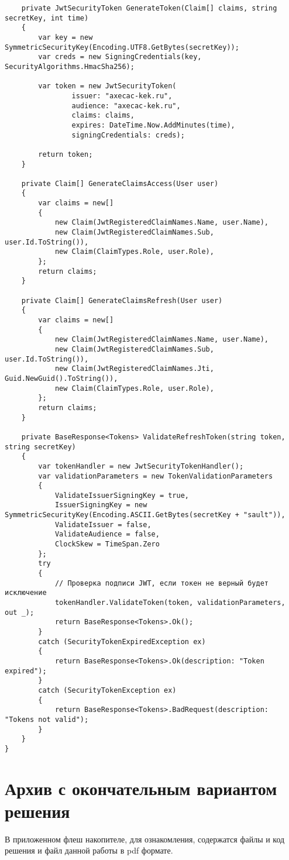 \begin{verbatim}
    private JwtSecurityToken GenerateToken(Claim[] claims, string secretKey, int time)
    {
        var key = new SymmetricSecurityKey(Encoding.UTF8.GetBytes(secretKey));
        var creds = new SigningCredentials(key, SecurityAlgorithms.HmacSha256);

        var token = new JwtSecurityToken(
                issuer: "axecac-kek.ru",
                audience: "axecac-kek.ru",
                claims: claims,
                expires: DateTime.Now.AddMinutes(time),
                signingCredentials: creds);

        return token;
    }

    private Claim[] GenerateClaimsAccess(User user)
    {
        var claims = new[]
        {
            new Claim(JwtRegisteredClaimNames.Name, user.Name),
            new Claim(JwtRegisteredClaimNames.Sub, user.Id.ToString()),
            new Claim(ClaimTypes.Role, user.Role),
        };
        return claims;
    }

    private Claim[] GenerateClaimsRefresh(User user)
    {
        var claims = new[]
        {
            new Claim(JwtRegisteredClaimNames.Name, user.Name),
            new Claim(JwtRegisteredClaimNames.Sub, user.Id.ToString()),
            new Claim(JwtRegisteredClaimNames.Jti, Guid.NewGuid().ToString()),
            new Claim(ClaimTypes.Role, user.Role),
        };
        return claims;
    }

    private BaseResponse<Tokens> ValidateRefreshToken(string token, string secretKey)
    {
        var tokenHandler = new JwtSecurityTokenHandler();
        var validationParameters = new TokenValidationParameters
        {
            ValidateIssuerSigningKey = true,
            IssuerSigningKey = new SymmetricSecurityKey(Encoding.ASCII.GetBytes(secretKey + "sault")),
            ValidateIssuer = false,
            ValidateAudience = false,
            ClockSkew = TimeSpan.Zero
        };
        try
        {
            // Проверка подписи JWT, если токен не верный будет исключение
            tokenHandler.ValidateToken(token, validationParameters, out _);
            return BaseResponse<Tokens>.Ok();
        }
        catch (SecurityTokenExpiredException ex)
        {
            return BaseResponse<Tokens>.Ok(description: "Token expired");
        }
        catch (SecurityTokenException ex)
        {
            return BaseResponse<Tokens>.BadRequest(description: "Tokens not valid");
        }
    }
}
\end{verbatim}


\section{Архив с окончательным вариантом решения}\label{app:Others}

В приложенном флеш накопителе, для ознакомления, содержатся файлы и код решения и файл данной работы в pdf формате.
